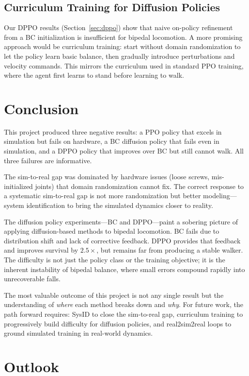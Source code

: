 \documentclass{article}
\begin{document}
\subsection{Curriculum Training for Diffusion Policies}

Our DPPO results (Section~\ref{sec:dppo}) show that naive on-policy refinement from a BC initialization is insufficient for bipedal locomotion. A more promising approach would be curriculum training: start without domain randomization to let the policy learn basic balance, then gradually introduce perturbations and velocity commands. This mirrors the curriculum used in standard PPO training, where the agent first learns to stand before learning to walk.


\section{Conclusion}

This project produced three negative results: a PPO policy that excels in simulation but fails on hardware, a BC diffusion policy that fails even in simulation, and a DPPO policy that improves over BC but still cannot walk. All three failures are informative.

The sim-to-real gap was dominated by hardware issues (loose screws, mis-initialized joints) that domain randomization cannot fix. The correct response to a systematic sim-to-real gap is not more randomization but better modeling---system identification to bring the simulated dynamics closer to reality.

The diffusion policy experiments---BC and DPPO---paint a sobering picture of applying diffusion-based methods to bipedal locomotion. BC fails due to distribution shift and lack of corrective feedback. DPPO provides that feedback and improves survival by $2.5\times$, but remains far from producing a stable walker. The difficulty is not just the policy class or the training objective; it is the inherent instability of bipedal balance, where small errors compound rapidly into unrecoverable falls.

The most valuable outcome of this project is not any single result but the understanding of \emph{where} each method breaks down and \emph{why}. For future work, the path forward requires: SysID to close the sim-to-real gap, curriculum training to progressively build difficulty for diffusion policies, and real2sim2real loops to ground simulated training in real-world dynamics.


\section{Outlook}
\end{document}
